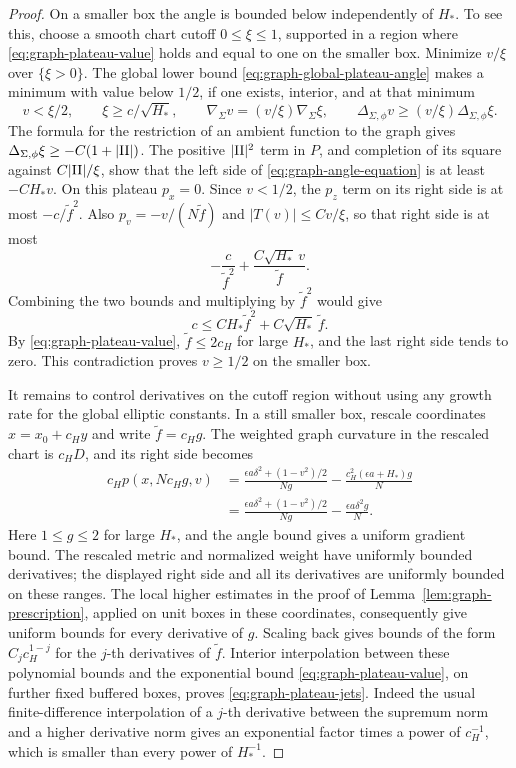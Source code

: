 \begin{proof}
On a smaller box the angle is bounded below independently of
\(H_*\).  To see this, choose a smooth chart cutoff
\(0\le\xi\le1\), supported in a region where
\eqref{eq:graph-plateau-value} holds and equal to one on the
smaller box.  Minimize \(v/\xi\) over \(\{\xi>0\}\).
The global lower bound \eqref{eq:graph-global-plateau-angle}
makes a minimum with value below \(1/2\), if one exists,
interior, and at that minimum
\[
 v<\xi/2,\qquad \xi\ge c/\sqrt{H_*},\qquad
 \nabla_\Sigma v=(v/\xi)\nabla_\Sigma\xi,\qquad
 \Delta_{\Sigma,\phi}v\ge(v/\xi)\Delta_{\Sigma,\phi}\xi.
\]
The formula for the restriction of an ambient function to the
graph gives
\(\Delta_{\Sigma,\phi}\xi\ge-C(1+|\mathrm{II}|)\).  The positive
\(|\mathrm{II}|^2\) term in \(P\), and completion of its square against
\(C|\mathrm{II}|/\xi\), show that the left side of
\eqref{eq:graph-angle-equation} is at least \(-CH_*v\).
On this plateau \(p_x=0\).  Since \(v<1/2\), the \(p_z\) term
on its right side is at most \(-c/\widetilde f^2\).
Also \(p_v=-v/(N\widetilde f)\) and
\(|T(v)|\le Cv/\xi\), so that right side is at most
\[
 -\frac{c}{\widetilde f^2}
       +\frac{C\sqrt{H_*}\,v}{\widetilde f}.
\]
Combining the two bounds and multiplying by \(\widetilde f^2\)
would give
\[
 c\le CH_*\widetilde f^2+
                  C\sqrt{H_*}\,\widetilde f .
\]
By \eqref{eq:graph-plateau-value},
\(\widetilde f\le2c_H\) for large \(H_*\), and the last right
side tends to zero.  This contradiction proves \(v\ge1/2\) on
the smaller box.

It remains to control derivatives on the cutoff region without
using any growth rate for the global elliptic constants.
In a still smaller box, rescale coordinates \(x=x_0+c_Hy\) and
write \(\widetilde f=c_Hg\).  The weighted graph curvature in
the rescaled chart is \(c_HD\), and its right side becomes
\begin{align*}
 c_Hp(x,Nc_Hg,v)
  &=\frac{\epsilon a\delta^2+(1-v^2)/2}{Ng}
       -\frac{c_H^2(\epsilon a+H_*)g}{N}\\
  &=\frac{\epsilon a\delta^2+(1-v^2)/2}{Ng}
       -\frac{\epsilon a\delta^2g}{N}.
\end{align*}
Here \(1\le g\le2\) for large \(H_*\), and the angle bound gives
a uniform gradient bound.  The rescaled metric and normalized
weight have uniformly bounded derivatives; the displayed
right side and all its derivatives are uniformly bounded on
these ranges.  The local higher estimates in the proof of
Lemma~\ref{lem:graph-prescription}, applied on unit boxes in
these coordinates, consequently give uniform bounds for every
derivative of \(g\).  Scaling back gives bounds of the form
\(C_jc_H^{1-j}\) for the \(j\)-th derivatives of
\(\widetilde f\).  Interior interpolation between these polynomial
bounds and the exponential bound \eqref{eq:graph-plateau-value}, on
further fixed buffered boxes, proves \eqref{eq:graph-plateau-jets}.
Indeed the usual finite-difference interpolation of a
\(j\)-th derivative between the supremum norm and a higher
derivative norm gives an exponential factor times a power of
\(c_H^{-1}\), which is smaller than every power of \(H_*^{-1}\).


\end{proof}
